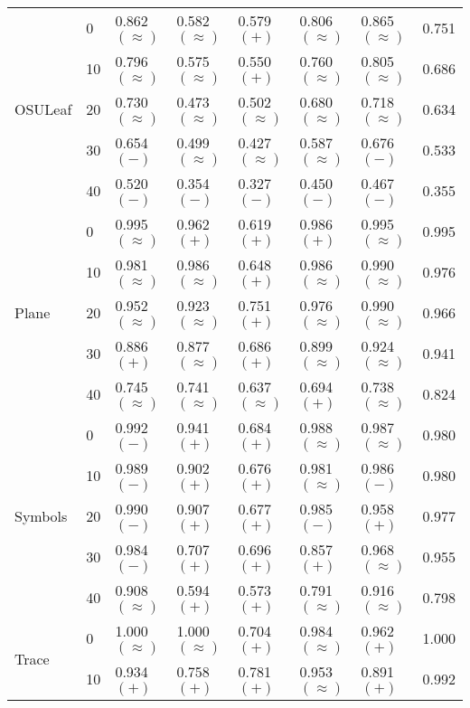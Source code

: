 \documentclass{llncs}
\begin{document}
\begin{table*}[th!]
\begin{tabular*}{\linewidth}{l @{\extracolsep{\fill}} l l l l l l l}
    \midrule
    \multirow{5}{0.13\linewidth}{OSULeaf}
    & 0 & 0.862 $(\approx)$ & 0.582 $(\approx)$ & 0.579 $(+)$ & 0.806 $(\approx)$ & 0.865 $(\approx)$ & 0.751\\
    & 10 & 0.796 $(\approx)$ & 0.575 $(\approx)$ & 0.550 $(+)$ & 0.760 $(\approx)$ & 0.805 $(\approx)$ & 0.686\\
    & 20 & 0.730 $(\approx)$ & 0.473 $(\approx)$ & 0.502 $(\approx)$ & 0.680 $(\approx)$ & 0.718 $(\approx)$ & 0.634\\
    & 30 & 0.654 $(-)$ & 0.499 $(\approx)$ & 0.427 $(\approx)$ & 0.587 $(\approx)$ & 0.676 $(-)$ & 0.533\\
    & 40 & 0.520 $(-)$ & 0.354 $(-)$ & 0.327 $(-)$ & 0.450 $(-)$ & 0.467 $(-)$ & 0.355\\
    \midrule
    \multirow{5}{0.13\linewidth}{Plane}
    & 0 & 0.995 $(\approx)$ & 0.962 $(+)$ & 0.619 $(+)$ & 0.986 $(+)$ & 0.995 $(\approx)$ & 0.995\\
    & 10 & 0.981 $(\approx)$ & 0.986 $(\approx)$ & 0.648 $(+)$ & 0.986 $(\approx)$ & 0.990 $(\approx)$ & 0.976\\
    & 20 & 0.952 $(\approx)$ & 0.923 $(\approx)$ & 0.751 $(+)$ & 0.976 $(\approx)$ & 0.990 $(\approx)$ & 0.966\\
    & 30 & 0.886 $(+)$ & 0.877 $(\approx)$ & 0.686 $(+)$ & 0.899 $(\approx)$ & 0.924 $(\approx)$ & 0.941\\
    & 40 & 0.745 $(\approx)$ & 0.741 $(\approx)$ & 0.637 $(\approx)$ & 0.694 $(+)$ & 0.738 $(\approx)$ & 0.824\\
    \midrule
    \multirow{5}{0.13\linewidth}{Symbols}
    & 0 & 0.992 $(-)$ & 0.941 $(+)$ & 0.684 $(+)$ & 0.988 $(\approx)$ & 0.987 $(\approx)$ & 0.980\\ 
    & 10 & 0.989 $(-)$ & 0.902 $(+)$ & 0.676 $(+)$ & 0.981 $(\approx)$ & 0.986 $(-)$ & 0.980\\
    & 20 & 0.990 $(-)$ & 0.907 $(+)$ & 0.677 $(+)$ & 0.985 $(-)$ & 0.958 $(+)$ & 0.977\\
    & 30 & 0.984 $(-)$ & 0.707 $(+)$ & 0.696 $(+)$ & 0.857 $(+)$ & 0.968 $(\approx)$ & 0.955\\
    & 40 & 0.908 $(\approx)$ & 0.594 $(+)$ & 0.573 $(+)$ & 0.791 $(\approx)$ & 0.916 $(\approx)$ & 0.798\\
    \midrule
    \multirow{5}{0.13\linewidth}{Trace}
    & 0 & 1.000 $(\approx)$ & 1.000 $(\approx)$ & 0.704 $(+)$ & 0.984 $(\approx)$ & 0.962 $(+)$ & 1.000\\
    & 10 & 0.934 $(+)$ & 0.758 $(+)$ & 0.781 $(+)$ & 0.953 $(\approx)$ & 0.891 $(+)$ & 0.992\\

\end{tabular*}
\end{table*}
\end{document}
